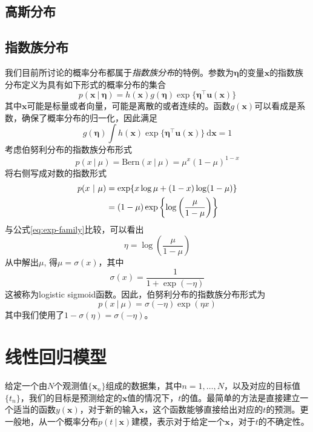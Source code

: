 \documentclass[11pt]{ctexbook}
\begin{document}
\section{高斯分布}
\section{指数族分布}
我们目前所讨论的概率分布都属于\emph{指数族分布}的特例。参数为$\bm\eta$的变量$\bm x$的指数族分布定义为具有如下形式的概率分布的集合
\begin{equation}
	\label{eq:exp-family}
	p(\bm x\ |\ \bm\eta) = h(\bm x)g(\bm \eta)\exp\{\bm\eta^\top\bm u(\bm x) \}
\end{equation}
其中$\bm x$可能是标量或者向量，可能是离散的或者连续的。函数$g(\bm x)$可以看成是系数，确保了概率分布的归一化，因此满足
\begin{equation}
	g(\bm\eta)\int h(\bm x)\exp\{\bm \eta^\top\bm u(\bm x)\} \ \mathrm{d}\bm x = 1
\end{equation}
考虑伯努利分布的指数族分布形式
\begin{equation}
	p(x\ |\ \mu) = \mathrm{Bern}(x\ |\ \mu) = \mu^x(1-\mu)^{1-x}
\end{equation}
将右侧写成对数的指数形式
\begin{align}
	p(x\ |\ \mu) &= \exp\{x\log \mu + (1-x)\log (1-\mu)\} \notag \\
	&= (1-\mu)\exp\left\{ \log\left( \frac{\mu}{1-\mu} \right) \right\}
\end{align}
与公式\ref{eq:exp-family}比较，可以看出
\begin{equation}
	\eta = \log\left( \frac{\mu}{1-\mu}\right)	
\end{equation}
从中解出$\mu$, 得$\mu=\sigma(x)$，其中
\begin{equation}
	\sigma(x) = \frac{1}{1+\exp(-\eta)}
\end{equation}
这被称为logistic sigmoid函数。因此，伯努利分布的指数族分布形式为
\begin{equation}
	p(x\ |\ \mu) = \sigma(-\eta)\exp(\eta x)
\end{equation}
其中我们使用了$1-\sigma(\eta)=\sigma(-\eta)$。
\chapter{线性回归模型}
给定一个由$N$个观测值$\{\bm x_n\}$组成的数据集，其中$n=1, \ldots, N$，以及对应的目标值$\{t_n\}$，我们的目标是预测给定的$\bm x$值的情况下，$t$的值。最简单的方法是直接建立一个适当的函数$y(\bm x)$，对于新的输入$\bm x$，这个函数能够直接给出对应的$t$的预测。更一般地，从一个概率分布$p(t\ |\ \bm x)$建模，表示对于给定一个$\bm x$，对于$t$的不确定性。
\end{document}
